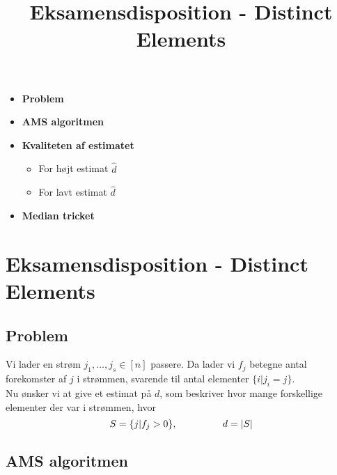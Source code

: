 
\title{Eksamensdisposition - Distinct Elements}


\maketitle

\begin{itemize}
  \item \textbf{Problem}
  \item \textbf{AMS algoritmen}
  \item \textbf{Kvaliteten af estimatet}
  \begin{itemize}
    \item For højt estimat $\hat d$
    \item For lavt estimat $\hat d$
  \end{itemize}
  \item \textbf{Median tricket}
\end{itemize}


\newpage
\section{Eksamensdisposition - Distinct Elements}



\subsection{Problem}
Vi lader en strøm $j_1, \dots, j_s \in [n]$ passere. Da lader vi $f_j$ betegne antal forekomster af $j$ i strømmen, svarende til antal elementer $\{i | j_i = j \}$.\\

Nu ønsker vi at give et estimat på $d$, som beskriver hvor mange forskellige elementer der var i strømmen, hvor
$$
S = \{j | f_j > 0 \}, {\ \ \ \ \ \ \ \ \ \ \ \ \ \ } d = |S|
$$

\subsection{AMS algoritmen}

